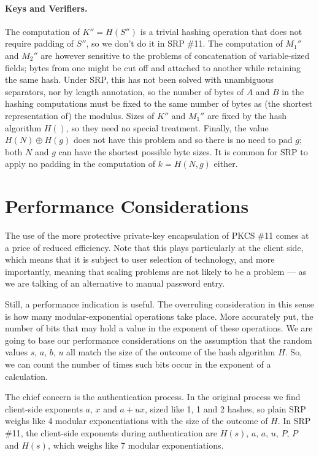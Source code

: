 \documentclass[a4paper,11pt]{article}
\def\pkcs11{PKCS$\;$\#11\xspace}
\def\srp11{SRP$\;$\#11\xspace}
\begin{document}
\paragraph{Keys and Verifiers.}
The computation of $K''=H(S'')$ is a trivial hashing operation that does not require padding of $S''$, so we don't do it in \srp11.  The computation of $M_1''$ and $M_2''$ are however sensitive to the problems of concatenation of variable-sized fields; bytes from one might be cut off and attached to another while retaining the same hash.  Under SRP, this has not been solved with unambiguous separators, nor by length annotation, so the number of bytes of $A$ and $B$ in the hashing computations must be fixed to the same number of bytes as (the shortest representation of) the modulus.  Sizes of $K''$ and $M_1''$ are fixed by the hash algorithm $H()$, so they need no special treatment.  Finally, the value $H(N)\oplus H(g)$ does not have this problem and so there is no need to pad $g$; both $N$ and $g$ can have the shortest possible byte sizes.  It is common for SRP to apply no padding in the computation of $k=H(N,g)$ either.

\section{Performance Considerations}

The use of the more protective private-key encapsulation of \pkcs11 comes at a price of reduced efficiency.  Note that this plays particularly at the client side, which means that it is subject to user selection of technology, and more importantly, meaning that scaling problems are not likely to be a problem --- as we are talking of an alternative to manual password entry.

Still, a performance indication is useful.  The overruling consideration in this sense is how many modular-exponential operations take place.  More accurately put, the number of bits that may hold a value in the exponent of these operations.  We are going to base our performance considerations on the assumption that the random values $s$, $a$, $b$, $u$ all match the size of the outcome of the hash algorithm $H$.  So, we can count the number of times such bits occur in the exponent of a calculation.

The chief concern is the authentication process.  In the original process we find client-side exponents $a$, $x$ and $a+ux$, sized like 1, 1 and 2 hashes, so plain SRP weighs like 4 modular exponentiations with the size of the outcome of $H$.  In \srp11, the client-side exponents during authentication are $H(s)$, $a$, $a$, $u$, $P$, $P$ and $H(s)$, which weighs like 7 modular exponentiations.
\end{document}
